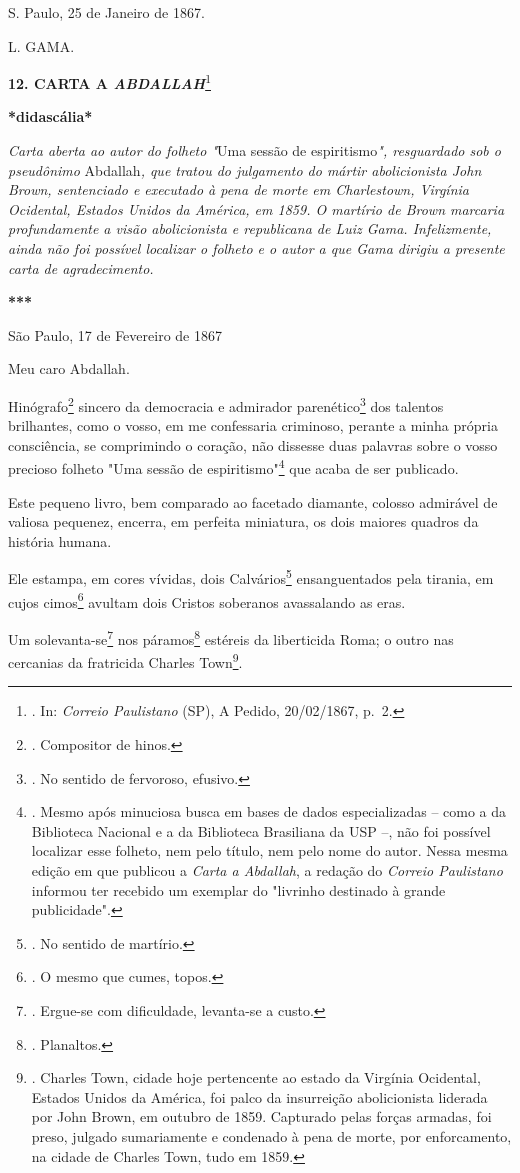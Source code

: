 S. Paulo, 25 de Janeiro de 1867.

L. GAMA.

\textbf{12. CARTA A \emph{ABDALLAH}}\footnote{. In: \emph{Correio
  Paulistano} (SP), A Pedido, 20/02/1867, p.~2.}

\textbf{*didascália*}

\emph{Carta aberta ao autor do folheto "}Uma sessão de
espiritismo\emph{", resguardado sob o pseudônimo} Abdallah\emph{, que
tratou do julgamento do mártir abolicionista John Brown, sentenciado e
executado à pena de morte em Charlestown, Virgínia Ocidental, Estados
Unidos da América, em 1859. O martírio de Brown marcaria profundamente a
visão abolicionista e republicana de Luiz Gama. Infelizmente, ainda não
foi possível localizar o folheto e o autor a que Gama dirigiu a presente
carta de agradecimento.}

\textbf{***}

São Paulo, 17 de Fevereiro de 1867

Meu caro Abdallah.

Hinógrafo\footnote{. Compositor de hinos.} sincero da democracia e
admirador parenético\footnote{. No sentido de fervoroso, efusivo.} dos
talentos brilhantes, como o vosso, em me confessaria criminoso, perante
a minha própria consciência, se comprimindo o coração, não dissesse duas
palavras sobre o vosso precioso folheto "Uma sessão de
espiritismo"\footnote{. Mesmo após minuciosa busca em bases de dados
  especializadas -- como a da Biblioteca Nacional e a da Biblioteca
  Brasiliana da USP --, não foi possível localizar esse folheto, nem
  pelo título, nem pelo nome do autor. Nessa mesma edição em que
  publicou a \emph{Carta a Abdallah}, a redação do \emph{Correio
  Paulistano} informou ter recebido um exemplar do "livrinho destinado à
  grande publicidade".} que acaba de ser publicado.

Este pequeno livro, bem comparado ao facetado diamante, colosso
admirável de valiosa pequenez, encerra, em perfeita miniatura, os dois
maiores quadros da história humana.

Ele estampa, em cores vívidas, dois Calvários\footnote{. No sentido de
  martírio.} ensanguentados pela tirania, em cujos cimos\footnote{. O
  mesmo que cumes, topos.} avultam dois Cristos soberanos avassalando as
eras.

Um solevanta-se\footnote{. Ergue-se com dificuldade, levanta-se a custo.}
nos páramos\footnote{. Planaltos.} estéreis da liberticida Roma; o outro
nas cercanias da fratricida Charles Town\footnote{. Charles Town, cidade
  hoje pertencente ao estado da Virgínia Ocidental, Estados Unidos da
  América, foi palco da insurreição abolicionista liderada por John
  Brown, em outubro de 1859. Capturado pelas forças armadas, foi preso,
  julgado sumariamente e condenado à pena de morte, por enforcamento, na
  cidade de Charles Town, tudo em 1859.}.

